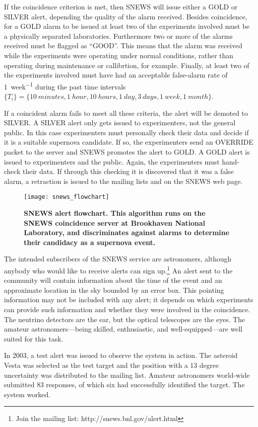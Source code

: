 	If the coincidence criterion is met, then SNEWS will issue either a GOLD or SILVER alert, depending the quality of the alarm received. Besides coincidence, for a GOLD alarm to be issued at least two of the experiments involved must be a physically separated laboratories. Furthermore two or more of the alarms received must be flagged as ``GOOD''. This means that the alarm was received while the experiments were operating under normal conditions, rather than operating during maintenance or callibrtion, for example. Finally, at least two of the experiments involved must have had an acceptable false-alarm rate of \SI[mode=text]{1}{week^{-1}} during the past time intervals $\{T_i\} = \{\SI[mode=text]{10}{minutes}, \SI[mode=text]{1}{hour}, \SI[mode=text]{10}{hours}, \SI[mode=text]{1}{day}, \SI[mode=text]{3}{days}, \SI[mode=text]{1}{week}, \SI[mode=text]{1}{month}\}$.

	If a coincident alarm fails to meet all these criteria, the alert will be demoted to SILVER. A SILVER alert only gets issued to experimenters, not the general public. In this case experimenters must personally check their data and decide if it is a suitable supernova candidate. If so, the experimenters send an OVERRIDE packet to the server and SNEWS promotes the alert to GOLD. A GOLD alert is issued to experimenters and the public. Again, the experimenters must hand-check their data. If through this checking it is discovered that it was a false alarm, a retraction is issued to the mailing lists and on the SNEWS web page.

	\begin{figure}[H]
		\centering
		\texttt{[image: snews\_flowchart]}
		\caption[SNEWS Flowchart]{\bf SNEWS alert flowchart\rm\cite{Scholberg2008}. This algorithm runs on the SNEWS coincidence server at Brookhaven National Laboratory, and discriminates against alarms to determine their candidacy as a supernova event.}
		\label{fig:flowchart}
	\end{figure}

	The intended subscribers of the SNEWS service are astronomers, although anybody who would like to receive alerts can sign up.\footnote{Join the mailing list: http://snews.bnl.gov/alert.html} An alert sent to the community will contain information about the time of the event and an approximate location in the sky bounded by an error box. This pointing information may not be included with any alert; it depends on which experiments can provide such information and whether they were involved in the coincidence. The neutrino detectors are the ear, but the optical telescopes are the eyes. The amateur astronomers---being skilled, enthusiastic, and well-equipped---are well suited for this task.

	In 2003, a test alert was issued to observe the system in action. The asteroid Vesta was selected as the test target and the position with a 13 degree uncertainty was distributed to the mailing list. Amateur astronomers world-wide submitted 83 responses, of which six had successfully identified the target\cite{Antonioli2004}. The system worked.

